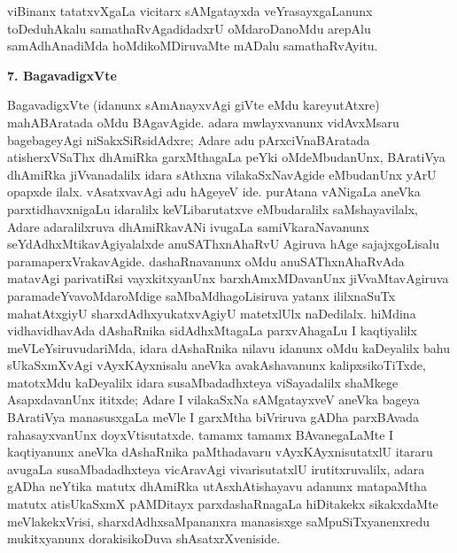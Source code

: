 viBinanx tatatxvXgaLa vicitarx sAMgatayxda veYrasayxgaLanunx toDeduhAkalu samathaRvAgadidadxrU oMdaroDanoMdu arepAlu samAdhAnadiMda hoMdikoMDiruvaMte mADalu samathaRvAyitu.

\bigskip
\begin{center}
{\Large\bf 7. BagavadigxVte}
\end{center}

BagavadigxVte (idanunx sAmAnayxvAgi giVte eMdu kareyutAtxre) mahABAratada oMdu BAgavAgide. adara mwlayxvanunx vidAvxMsaru bagebageyAgi niSakxSiRsidAdxre; Adare adu pArxciVnaBAratada atisherxVSaThx dhAmiRka garxMthagaLa peYki oMdeMbudanUnx, BAratiVya dhAmiRka jiVvanadalilx idara sAthxna vilakaSxNavAgide eMbudanUnx yArU opapxde ilalx. vAsatxvavAgi adu hAgeyeV ide. purAtana vANigaLa aneVka parxtidhavxni\-gaLu idaralilx keVLibarutatxve eMbudaralilx saMshayavilalx, Adare adaralilxruva dhAmiRka\-vANi ivugaLa samiVkaraNavanunx seYdAdhxMtikavAgiyalalxde anuSAThxnAhaRvU Agiruva hAge sajajxgoLisalu paramaperxVrakavAgide. dashaRnavanunx oMdu anuSAThxnAhaRvAda matavAgi parivatiRsi vayxkitxyanUnx barxhAmxMDavanUnx jiVvaMtavAgiruva paramadeYva\break\-voMdaroMdige saMbaMdhagoLisiruva yatanx ililxnaSuTx mahatAtxgiyU sharxdAdhxyukatx\-vAgiyU matetxlUlx naDedilalx. hiMdina vidhavidhavAda dAshaRnika sidAdhxMtagaLa parxvAhagaLu I kaqtiyalilx meVLeYsiruvudariMda, idara dAshaRnika nilavu idanunx oMdu kaDeyalilx bahu sUkaSxmXvAgi vAyxKAyxnisalu aneVka avakAshavanunx kalipxsikoTiTxde, matotxMdu kaDeyalilx idara susaMbadadhxteya viSayadalilx shaMkege AsapxdavanUnx ititxde; Adare I vilakaSxNa sAMgatayxveV aneVka bageya BAratiVya manasusxgaLa meVle I garxMtha biVriruva gADha parxBAvada rahasayxvanUnx doyxVtisutatxde. tamamx tamamx BAvanegaLaMte I kaqtiyanunx aneVka dAshaRnika paMthadavaru vAyxKAyxnisutatxlU itararu avugaLa susaMbadadhxteya vicAravAgi vivarisutatxlU irutitxruvalilx, adara gADha neYtika matutx dhAmiRka utAsxhAtishayavu adanunx matapaMtha matutx atisUkaSxmX pAMDitayx parxdashaRnagaLa hiDitakekx sikakxdaMte meVlakekxVrisi, sharxdAdhxsaMpananxra manasisxge saMpuSiTxyanenxredu mukitxyanunx dorakisikoDuva shAsatxrXveniside.

